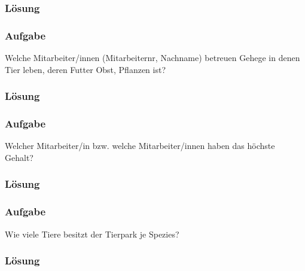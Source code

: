 \subsubsection*{Lösung}
\label{subsubsec:uebung_01.aufgabe_10c.loesung}

\subsubsection{Aufgabe}
\label{subsec:uebung_01.aufgabe_10d}
Welche Mitarbeiter/innen (Mitarbeiternr, Nachname) betreuen Gehege in denen Tier leben, deren Futter Obst, Pflanzen ist?

\subsubsection*{Lösung}
\label{subsubsec:uebung_01.aufgabe_10d.loesung}

\subsubsection{Aufgabe}
\label{subsec:uebung_01.aufgabe_10e}
Welcher Mitarbeiter/in bzw. welche Mitarbeiter/innen haben das höchste Gehalt?

\subsubsection*{Lösung}
\label{subsubsec:uebung_01.aufgabe_10e.loesung}

\subsubsection{Aufgabe}
\label{subsec:uebung_01.aufgabe_10f}
Wie viele Tiere besitzt der Tierpark je Spezies?

\subsubsection*{Lösung}
\label{subsubsec:uebung_01.aufgabe_10f.loesung}
